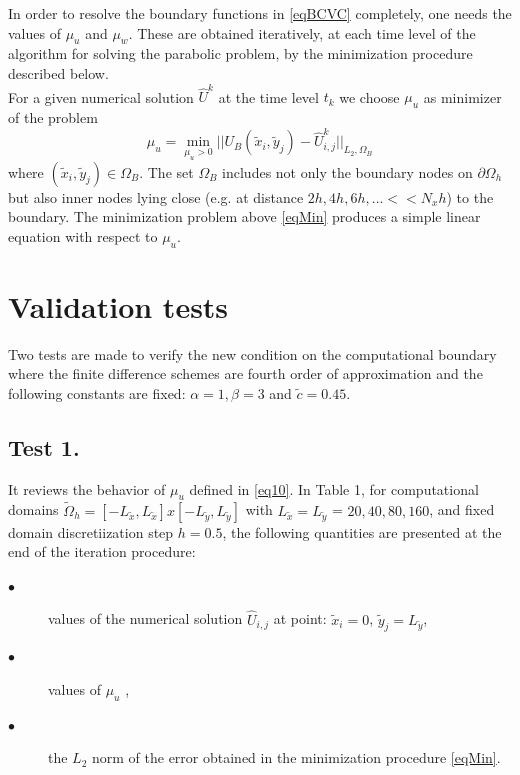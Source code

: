 \documentclass[12pt]{article}
\newcommand{\dO}{\partial\Omega_{h}}
\theoremstyle{theorem}
\theoremstyle{defi}
\begin{document}
In order to resolve the boundary functions in \eqref{eqBCVC} completely, one needs the values of $\mu_u$  and $\mu_w$. These are obtained iteratively, at each time level of the algorithm for solving the parabolic problem, by the minimization procedure described below. 
\\
For a given numerical solution $\widehat U ^k$  at the time level  $t_k$ we choose $\mu_u$  as minimizer of the problem
\begin{equation}\label{eqMin}
\mu_u = \min_{ \mu_u > 0 } || U_B( \tilde x_i, \tilde y_j) - \widehat U ^k_{i,j} ||_{L_2,\Omega_B}
\end{equation}
where  $( \tilde x_i, \tilde y_j) \in \Omega_B$. The set $\Omega_B$ includes not only the boundary nodes on $\dO$ but also inner nodes lying close (e.g. at distance $2h, 4h, 6h, ... << N_x h $) to the boundary. The minimization problem above \eqref{eqMin} produces a simple linear equation with respect to $\mu_u$.

\section{Validation tests}

Two tests are made to verify the new condition on the computational boundary where the finite difference schemes are fourth order of approximation and the following constants are fixed:
 $\alpha = 1, \beta = 3$  and  $ \tilde c = 0.45$.

\subsection{Test 1.}

It reviews the behavior of $\mu_u$  defined in  \eqref{eq10}. In Table 1, for computational domains  $\tilde \Omega_h = [-L_{\tilde x}, L_{\tilde x}] x  [-L_{\tilde y}, L_{\tilde y}]$
with $ L_{\tilde x} = L_{\tilde y}$ = $20, 40, 80, 160$, and fixed domain discretiization step $h = 0.5$, the following quantities are presented at the end of the iteration procedure:

\begin{description}
  \item[$\bullet$]values of the numerical solution $\widehat{U}_{i,j}$  at point: $\tilde {x}_i = 0$, $ \tilde {y}_j =   L_{\tilde y}$, 
  \item[$\bullet$ ] values of $\mu_u$ , 
\item[$\bullet$ ] the $L_2$  norm of the error obtained in the minimization procedure \eqref{eqMin}. 
\end{description}
\end{document}

